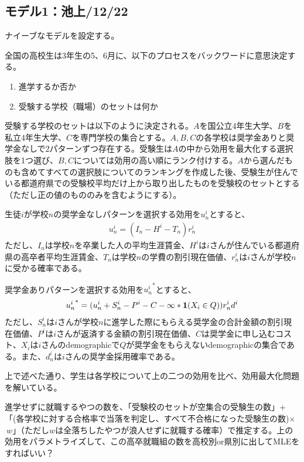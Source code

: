 \documentclass{jsarticle}
\begin{document}
	\subsection{モデル1：池上/12/22}
	ナイーブなモデルを設定する。
	\par
	全国の高校生は3年生の5、6月に、以下のプロセスをバックワードに意思決定する。
	\begin{enumerate}
		\item 進学するか否か
		\item 受験する学校（職場）のセットは何か
	\end{enumerate}
	受験する学校のセットは以下のように決定される。$A$を国公立4年生大学、$B$を私立4年生大学、$C$を専門学校の集合とする。$A,B,C$の各学校は奨学金ありと奨学金なしで2パターンずつ存在する。受験生は$A$の中から効用を最大化する選択肢を1つ選び、$B,C$については効用の高い順にランク付けする。$A$から選んだものも含めてすべての選択肢についてのランキングを作成した後、受験生が住んでいる都道府県での受験校平均だけ上から取り出したものを受験校のセットとする（ただし正の値のもののみを含むようにする）。
	\par
	生徒$i$が学校$n$の奨学金なしパターンを選択する効用を$u_n^i$とすると、
	\begin{align*}
		u_n^i = (I_n - H^i - T_n) r_n^i
	\end{align*}
	ただし、$I_n$は学校$n$を卒業した人の平均生涯賃金、$H^i$は$i$さんが住んでいる都道府県の高卒者平均生涯賃金、$T_n$は学校$n$の学費の割引現在価値、$r_n^i$は$i$さんが学校$n$に受かる確率である。\par
	奨学金ありパターンを選択する効用を${u_n^i}^{*}$とすると、
	\begin{align*}
		{u_n^i}^{*} = (u_n^i + S_n^i - P^i - C - \infty * {\bf 1}(X_i \in Q)) r_n^i d^i
	\end{align*}
	ただし、$S_n^i$は$i$さんが学校$n$に進学した際にもらえる奨学金の合計金額の割引現在価値、$P^i$は$i$さんが返済する金額の割引現在価値、$C$は奨学金に申し込むコスト、$X_i$は$i$さんのdemographicで$Q$が奨学金をもらえないdemographicの集合である。また、$d_n^i$は$i$さんの奨学金採用確率である。
	\par
	上で述べた通り、学生は各学校について上の二つの効用を比べ、効用最大化問題を解いている。
	\par
	進学せずに就職するやつの数を、「受験校のセットが空集合の受験生の数」+「(各学校に対する合格率で当落を判定し、すべて不合格になった受験生の数)×$\ w$」（ただし$w$は全落ちしたやつが浪人せずに就職する確率）で推定する。上の効用をパラメトライズして、この高卒就職組の数を高校別or県別に出してMLEをすればいい？
	
\end{document}
